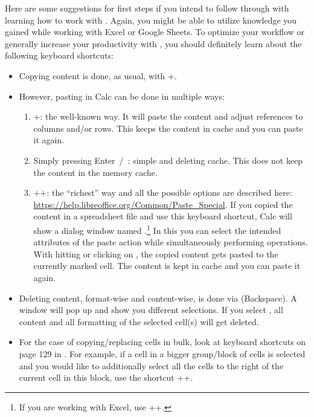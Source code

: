 Here are some suggestions for first steps if you intend to follow through with learning how to work with \loc.
Again, you might be able to utilize knowledge you gained while working with Excel or Google Sheets.
To optimize your workflow  or generally increase your productivity with \tfn, you should definitely learn about the following keyboard shortcuts:
\begin{itemize}
	\item Copying content is done, as usual, with +.
	\item However, pasting in Calc can be done in multiple ways:
	\begin{enumerate}
		\item {}+: the well-known way.
		It will paste the content and adjust references to columns and/or rows.
		This keeps the content in cache and you can paste it again.
		\item Simply pressing Enter~/~\keystroke{\( \hookleftarrow \)}: simple and deleting cache.
		This does not keep the content in the memory cache.
		\item {}++: the ``richest'' way and all the possible options are described here: \url{https://help.libreoffice.org/Common/Paste_Special}.
		If you copied the content in a spreadsheet file and use this keyboard shortcut, Calc will show a dialog window named .\footnote{If you are working with Excel, use ++.}
		In this you can select the intended attributes of the paste action while simultaneously performing operations.
		With hitting \keystroke{\( \hookleftarrow \)} or clicking on , the copied content gets pasted to the currently marked cell.
		The content is kept in cache and you can paste it again.
	\end{enumerate}
	\item Deleting content, format-wise and content-wise, is done via \keystroke{\( \longleftarrow \)} (Backspace).
	A window will pop up and show you different selections.
	If you select , all content and all formatting of the selected cell(s) will get deleted.
	\item For the case of copying/replacing cells in bulk, look at keyboard shortcuts on page 129 in .
	For example, if a cell in a bigger group/block of cells is selected and you would like to additionally select all the cells to the right of the current cell in this block, use the shortcut ++\keystroke{\( \rightarrow \)}.
\end{itemize}

